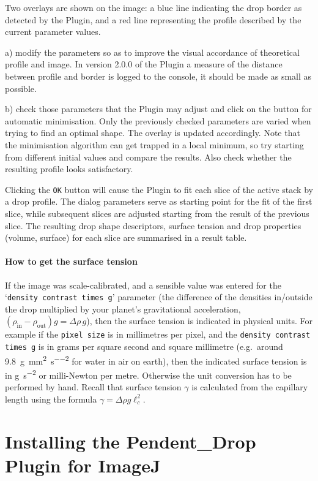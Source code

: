 \documentclass[fleqn]{scrartcl}
\begin{document}
Two overlays are shown on the image: a blue line indicating the drop
border as detected by the Plugin, and a red line representing the
profile described by the current parameter values.

a) modify the parameters so as to improve the visual accordance of
theoretical profile and image. In version 2.0.0 of the Plugin a
measure of the distance between profile and border is logged to the
console, it should be made as small as possible.

b) check those parameters that the Plugin may adjust and click on the
button for automatic minimisation. Only the previously checked
parameters are varied when trying to find an optimal shape. The
overlay is updated accordingly. Note that the minimisation algorithm
can get trapped in a local minimum, so try starting from different
initial values and compare the results. Also check whether the
resulting profile looks satisfactory.

Clicking the \texttt{OK} button will cause the Plugin to fit each
slice of the active stack by a drop profile. The dialog parameters
serve as starting point for the fit of the first slice, while
subsequent slices are adjusted starting from the result of the
previous slice. The resulting drop shape descriptors, surface tension
and drop properties (volume, surface) for each slice are summarised in
a result table.

\paragraph{How to get the surface tension}
If the image was scale-calibrated, and a sensible value was entered
for the `\texttt{density contrast times g}' parameter (the difference
of the densities in/outside the drop multiplied by your planet's
gravitational acceleration, $(\rho_{\mathrm{in}}-\rho_{\mathrm{out}})g
= \Delta\rho\,g$), then the surface tension is indicated in physical
units. For example if the \texttt{pixel size} is in millimetres per
pixel, and the \texttt{density contrast times g} is in grams per
square second and square millimetre (e.g.\ around
\SI{9.8}{\gram\per\square\milli\metre\per\square\second} for water in
air on earth), then the indicated surface tension is in
\si{\gram\per\square\second} or milli-Newton per metre. Otherwise the
unit conversion has to be performed by hand. Recall that surface
tension $\gamma$ is calculated from the capillary length using the
formula $\gamma = \Delta\!\rho g \ell_c^2$.


\section{Installing the Pendent\_Drop Plugin for ImageJ}
\label{sec:installation}
\end{document}
